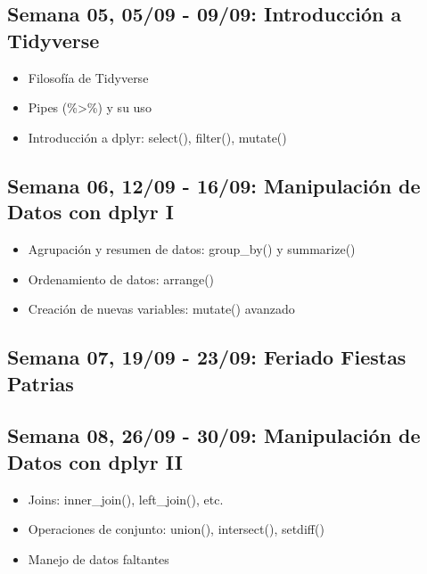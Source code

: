 \documentclass[11pt,letter,]{article}
\providecommand{\tightlist}{%
  \setlength{\itemsep}{0pt}\setlength{\parskip}{0pt}}
\begin{document}
\hypertarget{semana-05-0509---0909-introducciuxf3n-a-tidyverse}{%
\subsection{Semana 05, 05/09 - 09/09: Introducción a
Tidyverse}\label{semana-05-0509---0909-introducciuxf3n-a-tidyverse}}

\begin{itemize}
\tightlist
\item
  Filosofía de Tidyverse
\item
  Pipes (\%\textgreater\%) y su uso
\item
  Introducción a dplyr: select(), filter(), mutate()
\end{itemize}

\hypertarget{semana-06-1209---1609-manipulaciuxf3n-de-datos-con-dplyr-i}{%
\subsection{Semana 06, 12/09 - 16/09: Manipulación de Datos con dplyr
I}\label{semana-06-1209---1609-manipulaciuxf3n-de-datos-con-dplyr-i}}

\begin{itemize}
\tightlist
\item
  Agrupación y resumen de datos: group\_by() y summarize()
\item
  Ordenamiento de datos: arrange()
\item
  Creación de nuevas variables: mutate() avanzado
\end{itemize}

\hypertarget{semana-07-1909---2309-feriado-fiestas-patrias}{%
\subsection{Semana 07, 19/09 - 23/09: Feriado Fiestas
Patrias}\label{semana-07-1909---2309-feriado-fiestas-patrias}}

\hypertarget{semana-08-2609---3009-manipulaciuxf3n-de-datos-con-dplyr-ii}{%
\subsection{Semana 08, 26/09 - 30/09: Manipulación de Datos con dplyr
II}\label{semana-08-2609---3009-manipulaciuxf3n-de-datos-con-dplyr-ii}}

\begin{itemize}
\tightlist
\item
  Joins: inner\_join(), left\_join(), etc.
\item
  Operaciones de conjunto: union(), intersect(), setdiff()
\item
  Manejo de datos faltantes
\end{itemize}
\end{document}
